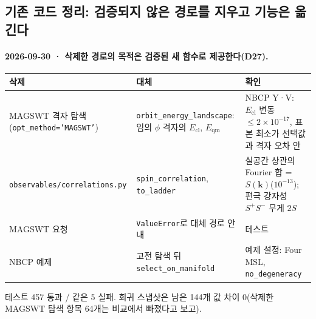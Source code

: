 \subsection{기존 코드 정리: 검증되지 않은 경로를 지우고 기능은 옮긴다}\label{legacy-cleanup}
\begingroup%
  \framesubtitle{2026-09-30 · 삭제한 경로의 목적은 검증된 새 함수로 제공한다(D27).}
  \footnotesize\renewcommand{\arraystretch}{1.1}
  \begin{tabularx}{\textwidth}{@{}P{3.4cm}P{3.6cm}Y@{}}
    \toprule
    삭제 & 대체 & 확인 \\
    \midrule
    MAGSWT 격자 탐색(\texttt{opt\_method='MAGSWT'}) & \texttt{orbit\_energy\_landscape}: 임의 $\phi$ 격자의 $E_{\mathrm{cl}}$, $E_{\mathrm{qm}}$ & NBCP Y·V: $E_{\mathrm{cl}}$ 변동 $\le2\times10^{-17}$, 표본 최소가 선택값과 격자 오차 안 \\
    \texttt{observables/correlations.py} & \texttt{spin\_correlation}, \texttt{to\_ladder} & 실공간 상관의 Fourier 합 = $S(\mathbf k)$($10^{-13}$); 편극 강자성 $S^{+}S^{-}$ 무게 $2S$ \\
    MAGSWT 요청 & \texttt{ValueError}로 대체 경로 안내 & 테스트 \\
    NBCP 예제 & 고전 탐색 뒤 \texttt{select\_on\_manifold} & 예제 설정: Four MSL, \texttt{no\_degeneracy} \\
    \bottomrule
  \end{tabularx}
  \par\medskip
  테스트 457 통과 / 같은 5 실패. 회귀 스냅샷은 남은 144개 값 차이 0(삭제한 MAGSWT 탐색 항목 64개는 비교에서 빠졌다고 보고).
  \par\medskip
\endgroup


